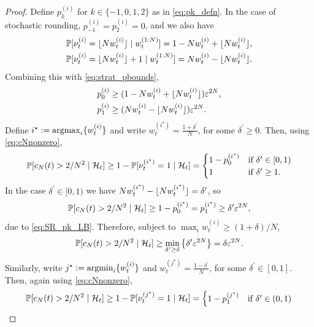 \begin{proof}
Define $p_k^{(i)}$ for $k\in\{-1,0,1,2\}$ as in \eqref{eq:pk_defn}. In the case of stochastic rounding,
$p_{-1}^{(i)} = p_2^{(i)} =0$, and we also have
\begin{align*}
&\Prob[ \nu_t^{(i)} = \flnw \mid w_t^{(1:N)} ]
= 1- N w_t^{(i)} + \flnw , \\
&\Prob[ \nu_t^{(i)} = \flnw +1 \mid w_t^{(1:N)} ]
= N w_t^{(i)} - \flnw .
\end{align*}
Combining this with \eqref{eq:strat_pbounds},
\begin{align}
p_0^{(i)} 
&\geq ( 1- N w_t^{(i)} + \flnw ) \varepsilon^{2N} , \notag\\
p_1^{(i)} 
&\geq ( N w_t^{(i)} - \flnw ) \varepsilon^{2N} . \label{eq:SR_pk_LB}
\end{align}
Define $i^\star := \argmax_i \{ w_t^{(i)} \}$ and write
$w_t^{(i^\star)} = \frac{1+\delta^\prime}{N}$, for some $\delta^\prime \geq 0$.
Then, using \eqref{eq:cNnonzero}, 
\begin{equation*}
\Prob[ c_N(t) > 2/N^2 \mid \mathcal{H}_t ]
\geq 1- \Prob[ \nu_t^{(i^\star)} =1 \mid \mathcal{H}_t ]
= \begin{cases}
    1 - p_0^{(i^\star)} & \text{if } \delta^\prime \in [0,1) \\
    1 & \text{if } \delta^\prime \geq 1 .
\end{cases}
\end{equation*}
In the case $\delta^\prime \in [0,1)$ we have $N w_t^{(i^\star)} - \flnw[i^\star] = \delta^\prime$, so
\begin{equation*}
\Prob[ c_N(t) > 2/N^2 \mid \mathcal{H}_t ]
\geq 1 - p_0^{(i^\star)}
= p_1^{(i^\star)}
\geq \delta^\prime \varepsilon^{2N} ,
\end{equation*}
due to \eqref{eq:SR_pk_LB}.
Therefore, subject to $\max_i w_t^{(i)} \geq (1+\delta)/N$,
\begin{equation*}
\Prob[ c_N(t) > 2/N^2 \mid \mathcal{H}_t ]
\geq \min_{\delta^\prime \geq \delta} 
        \left\{ \delta^\prime \varepsilon^{2N} \right\}
= \delta \varepsilon^{2N} .
\end{equation*}
Similarly, write $j^\star := \argmin_i \{ w_t^{(i)} \}$ and
$w_t^{(j^\star)} = \frac{1-\delta^\prime}{N}$, for some 
$\delta^\prime \in [0,1]$.
Then, again using \eqref{eq:cNnonzero},
\begin{equation*}
\Prob[ c_N(t) > 2/N^2 \mid \mathcal{H}_t ]
\geq 1- \Prob[ \nu_t^{(j^\star)} =1 \mid \mathcal{H}_t ]
= \begin{cases}
    1 - p_1^{(j^\star)} & \text{if } \delta^\prime \in (0,1) \\

\end{cases}
\end{equation*}
\end{proof}
